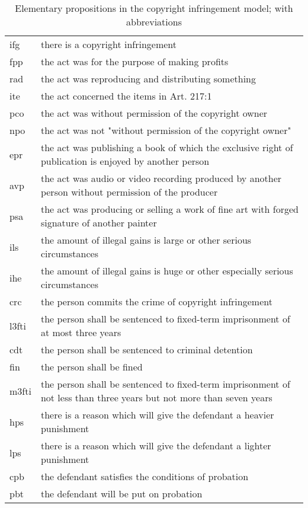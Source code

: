 \documentclass{IOS-Book-Article}
\begin{document}
\begin{table}[t]
	\tiny
	\caption{Elementary propositions in the copyright infringement model; with abbreviations}
	\label{tab:long}
	\begin{tabularx}{\textwidth}{p{0.5cm}|p{11cm}}
		\hline
		ifg & there is a copyright infringement\\
		fpp & the act was for the purpose of making profits\\
		rad & the act was reproducing and distributing something\\
		ite & the act concerned the items in Art. 217:1\\
		pco & the act was without permission of the copyright owner\\
		npo & the act was not "without permission of the copyright owner"\\
		epr & the act was publishing a book of which the exclusive right of publication is enjoyed by another person\\
		avp & the act was audio or video recording produced by another person without permission of the producer\\
		psa & the act was producing or selling a work of fine art with forged signature of another painter\\
		ils & the amount of illegal gains is large or other serious circumstances\\
		ihe & the amount of illegal gains is huge or other especially serious circumstances\\
		crc & the person commits the crime of copyright infringement\\
		l3fti & the person shall be sentenced to fixed-term imprisonment of at most three years\\
		cdt & the person shall be sentenced to criminal detention\\
		fin & the person shall be fined\\
		m3fti & the person shall be sentenced to fixed-term imprisonment of not less than three years but not more than seven years\\
		hps & there is a reason which will give the defendant a heavier punishment\\
		lps & there is a reason which will give the defendant a lighter punishment\\
		cpb & the defendant satisfies the conditions of probation\\
		pbt & the defendant will be put on probation\\
		\hline
	\end{tabularx}
\end{table}
\normalsize
\end{document}
